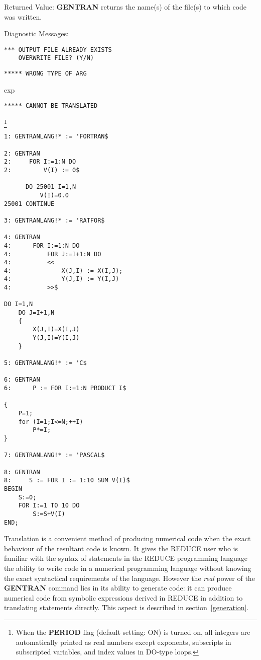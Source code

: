 \begin{describe}{Returned Value:}
{\bf GENTRAN}  returns the name(s) of the file(s) to which code was written.
\end{describe}
\begin{describe}{Diagnostic Messages:}
\begin{verbatim}
*** OUTPUT FILE ALREADY EXISTS
    OVERWRITE FILE? (Y/N)
\end{verbatim}
\begin{verbatim}
***** WRONG TYPE OF ARG
\end{verbatim}
exp
\begin{verbatim}
***** CANNOT BE TRANSLATED
\end{verbatim}
\end{describe}
\begin{describe}{\example\footnote{When the {\bf PERIOD} flag (default
setting: ON) is turned on, all 
integers are automatically printed as real numbers except exponents,
subscripts in subscripted variables, and index values in DO-type loops.}}
\begin{verbatim}
1: GENTRANLANG!* := 'FORTRAN$

2: GENTRAN
2:     FOR I:=1:N DO
2:         V(I) := 0$

      DO 25001 I=1,N
          V(I)=0.0
25001 CONTINUE

3: GENTRANLANG!* := 'RATFOR$ 

4: GENTRAN 
4:      FOR I:=1:N DO 
4:          FOR J:=I+1:N DO 
4:          << 
4:              X(J,I) := X(I,J); 
4:              Y(J,I) := Y(I,J) 
4:          >>$ 

DO I=1,N
    DO J=I+1,N
    {
        X(J,I)=X(I,J)
        Y(J,I)=Y(I,J)
    }

5: GENTRANLANG!* := 'C$ 

6: GENTRAN 
6:      P := FOR I:=1:N PRODUCT I$ 

{
    P=1;
    for (I=1;I<=N;++I)
        P*=I;
}

7: GENTRANLANG!* := 'PASCAL$

8: GENTRAN
8:     S := FOR I := 1:10 SUM V(I)$
BEGIN
    S:=0;
    FOR I:=1 TO 10 DO
        S:=S+V(I)
END;
\end{verbatim}
\end{describe}


 Translation is a convenient method of producing
numerical code when the exact behaviour of the resultant code is
known.  It gives the REDUCE user who is familiar with the syntax of
statements in the REDUCE programming language the ability to write
code in a numerical programming language without knowing the exact
syntactical requirements of the language.  However the {\em real}
power of the {\bf GENTRAN} command lies in its ability to generate
code: it can produce numerical code from symbolic expressions derived
in REDUCE in addition to translating statements directly.  This aspect
is described in section~\ref{generation}.


